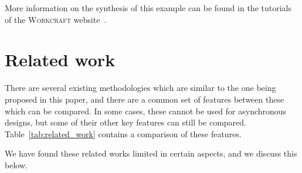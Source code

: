 \documentclass[british, journal]{IEEEtran}
\newcommand{\noun}[1]{\textsc{#1}}
\begin{document}
More information on the synthesis of this example can be found in the tutorials of the \noun{Workcraft} website~\cite{Workcraft_website}.



\section{Related work\label{sec:related-work}}

There are several existing methodologies which are similar to the
one being proposed in this paper, and there are a common set of features between these which can be compared.
In some cases, these cannot be used for asynchronous designs, but some of their other key features can still be compared.
Table~\ref{tab:related_work} contains a comparison of these features.

We have found these related works limited in certain aspects, and we discuss this below.
\end{document}
